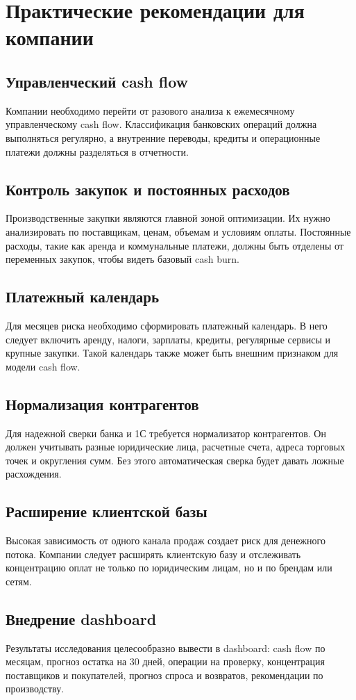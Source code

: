 \chapter{Практические рекомендации для компании}

\section{Управленческий cash flow}

Компании необходимо перейти от разового анализа к ежемесячному управленческому cash flow. Классификация банковских операций должна выполняться регулярно, а внутренние переводы, кредиты и операционные платежи должны разделяться в отчетности.

\section{Контроль закупок и постоянных расходов}

Производственные закупки являются главной зоной оптимизации. Их нужно анализировать по поставщикам, ценам, объемам и условиям оплаты. Постоянные расходы, такие как аренда и коммунальные платежи, должны быть отделены от переменных закупок, чтобы видеть базовый cash burn.

\section{Платежный календарь}

Для месяцев риска необходимо сформировать платежный календарь. В него следует включить аренду, налоги, зарплаты, кредиты, регулярные сервисы и крупные закупки. Такой календарь также может быть внешним признаком для модели cash flow.

\section{Нормализация контрагентов}

Для надежной сверки банка и 1С требуется нормализатор контрагентов. Он должен учитывать разные юридические лица, расчетные счета, адреса торговых точек и округления сумм. Без этого автоматическая сверка будет давать ложные расхождения.

\section{Расширение клиентской базы}

Высокая зависимость от одного канала продаж создает риск для денежного потока. Компании следует расширять клиентскую базу и отслеживать концентрацию оплат не только по юридическим лицам, но и по брендам или сетям.

\section{Внедрение dashboard}

Результаты исследования целесообразно вывести в dashboard: cash flow по месяцам, прогноз остатка на 30 дней, операции на проверку, концентрация поставщиков и покупателей, прогноз спроса и возвратов, рекомендации по производству.
